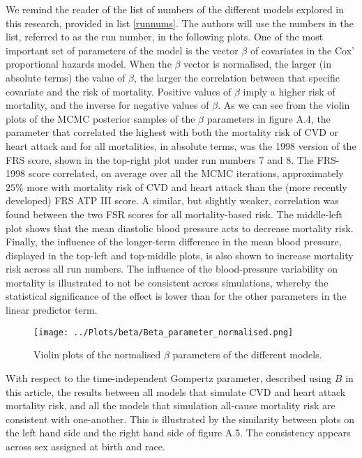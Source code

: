 \documentclass[
]{article}
\begin{document}
We remind the reader of the list of numbers of the different models
explored in this research, provided in list \ref{runnums}. The authors
will use the numbers in the list, referred to as the run number, in the
following plots. One of the most important set of parameters of the
model is the vector \(\beta\) of covariates in the Cox' proportional
hazards model. When the \(\beta\) vector is normalised, the larger (in
absolute terms) the value of \(\beta\), the larger the correlation
between that specific covariate and the risk of mortality. Positive
values of \(\beta\) imply a higher risk of mortality, and the inverse
for negative values of \(\beta\). As we can see from the violin plots of
the MCMC posterior samples of the \(\beta\) parameters in figure A.4,
the parameter that correlated the highest with both the mortality risk
of CVD or heart attack and for all mortalities, in absolute terms, was
the 1998 version of the FRS score, shown in the top-right plot under run
numbers 7 and 8. The FRS-1998 score correlated, on average over all the
MCMC iterations, approximately \(25\%\) more with mortality risk of CVD
and heart attack than the (more recently developed) FRS ATP III score. A
similar, but slightly weaker, correlation was found between the two FSR
scores for all mortality-based risk. The middle-left plot shows that the
mean diastolic blood pressure acts to decrease mortality risk. Finally,
the influence of the longer-term difference in the mean blood pressure,
displayed in the top-left and top-middle plots, is also shown to
increase mortality risk across all run numbers. The influence of the
blood-pressure variability on mortality is illustrated to not be
consistent across simulations, whereby the statistical significance of
the effect is lower than for the other parameters in the linear
predictor term.

\begin{figure}
\centering
\texttt{[image: ../Plots/beta/Beta\_parameter\_normalised.png]}
\caption{Violin plots of the normalised \(\beta\) parameters of the
different models.}
\end{figure}

With respect to the time-independent Gompertz parameter, described using
\(B\) in this article, the results between all models that simulate CVD
and heart attack mortality risk, and all the models that simulation
all-cause mortality risk are consistent with one-another. This is
illustrated by the similarity between plots on the left hand side and
the right hand side of figure A.5. The consistency appears across sex
assigned at birth and race.
\end{document}
